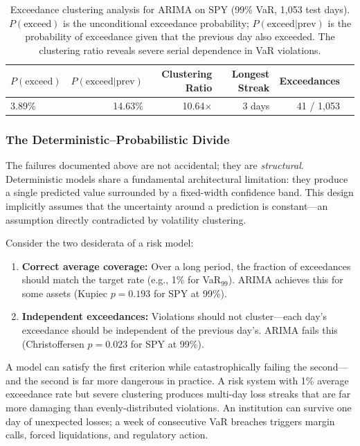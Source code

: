 \documentclass[11pt,a4paper]{article}
\begin{document}
\begin{table}[H]
\centering
\caption{Exceedance clustering analysis for ARIMA on SPY (99\% VaR, 1{,}053 test days). $P(\text{exceed})$ is the unconditional exceedance probability; $P(\text{exceed}|\text{prev})$ is the probability of exceedance given that the previous day also exceeded. The clustering ratio reveals severe serial dependence in VaR violations.}
\label{tab:exceedance}
\small
\begin{tabular}{@{}lrrrrr@{}}
\toprule
$P(\text{exceed})$ & $P(\text{exceed}|\text{prev})$ & \textbf{Clustering Ratio} & \textbf{Longest Streak} & \textbf{Exceedances} \\
\midrule
3.89\% & 14.63\% & 10.64$\times$ & 3 days & 41 / 1{,}053 \\
\bottomrule
\end{tabular}
\end{table}

\subsubsection{The Deterministic--Probabilistic Divide}
\label{sec:det_vs_prob}

The failures documented above are not accidental; they are \emph{structural}.
Deterministic models share a fundamental architectural limitation: they produce a single predicted value surrounded by a fixed-width confidence band.
This design implicitly assumes that the uncertainty around a prediction is constant---an assumption directly contradicted by volatility clustering.

Consider the two desiderata of a risk model:
\begin{enumerate}[leftmargin=1.5em]
    \item \textbf{Correct average coverage:} Over a long period, the fraction of exceedances should match the target rate (e.g., 1\% for VaR$_{99}$). ARIMA achieves this for some assets (Kupiec $p = 0.193$ for SPY at 99\%).
    \item \textbf{Independent exceedances:} Violations should not cluster---each day's exceedance should be independent of the previous day's. ARIMA fails this (Christoffersen $p = 0.023$ for SPY at 99\%).
\end{enumerate}

A model can satisfy the first criterion while catastrophically failing the second---and the second is far more dangerous in practice.
A risk system with 1\% average exceedance rate but severe clustering produces multi-day loss streaks that are far more damaging than evenly-distributed violations.
An institution can survive one day of unexpected losses; a week of consecutive VaR breaches triggers margin calls, forced liquidations, and regulatory action.
\end{document}
